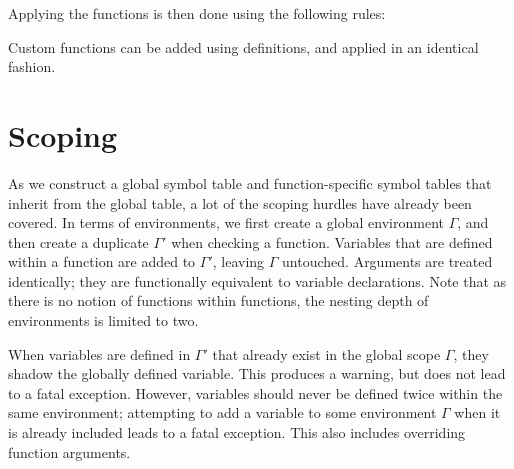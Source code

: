 \documentclass[a4paper]{article}
\begin{document}
Applying the functions is then done using the following rules:

\parbox{.5\linewidth}{
  {\sf
  \begin{prooftree}
  \end{prooftree}
  }
}
\parbox{.5\linewidth}{
  {\sf
  \begin{prooftree}
  \end{prooftree}
  }
}

\parbox{.5\linewidth}{
  {\sf
  \begin{prooftree}
  \end{prooftree}
  }
}
\parbox{.5\linewidth}{
  {\sf
  \begin{prooftree}
  \end{prooftree}
  }
}

Custom functions can be added using definitions, and applied in an identical fashion.

\section{Scoping}

As we construct a global symbol table and function-specific symbol tables that inherit from the global table, a lot of the scoping hurdles have already been covered. In terms of environments, we first create a global environment $\Gamma$, and then create a duplicate $\Gamma'$ when checking a function. Variables that are defined within a function are added to $\Gamma'$, leaving $\Gamma$ untouched. Arguments are treated identically; they are functionally equivalent to variable declarations. Note that as there is no notion of functions within functions, the nesting depth of environments is limited to two.

When variables are defined in $\Gamma'$ that already exist in the global scope $\Gamma$, they shadow the globally defined variable. This produces a warning, but does not lead to a fatal exception. However, variables should never be defined twice within the same environment; attempting to add a variable to some environment $\Gamma$ when it is already included leads to a fatal exception. This also includes overriding function arguments.
\end{document}
